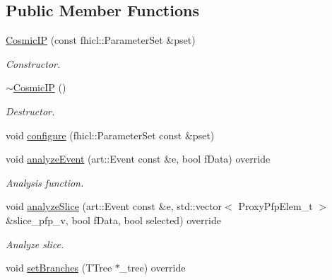 \subsection*{Public Member Functions}
\begin{DoxyCompactItemize}
\item 
\hyperlink{classanalysis_1_1CosmicIP_aa34450dae6a5ea2d51520aefcc9c0e6f}{Cosmic\+IP} (const fhicl\+::\+Parameter\+Set \&pset)
\begin{DoxyCompactList}\small\item\em Constructor. \end{DoxyCompactList}\item 
\hyperlink{classanalysis_1_1CosmicIP_a7edbd55f2290fab4c766f9a749731626}{$\sim$\+Cosmic\+IP} ()\hypertarget{classanalysis_1_1CosmicIP_a7edbd55f2290fab4c766f9a749731626}{}\label{classanalysis_1_1CosmicIP_a7edbd55f2290fab4c766f9a749731626}

\begin{DoxyCompactList}\small\item\em Destructor. \end{DoxyCompactList}\item 
void \hyperlink{classanalysis_1_1CosmicIP_af2564ec208979037940ff500dea10246}{configure} (fhicl\+::\+Parameter\+Set const \&pset)
\item 
void \hyperlink{classanalysis_1_1CosmicIP_aece9b4c45c6e1771df582b2c5e40c5d5}{analyze\+Event} (art\+::\+Event const \&e, bool f\+Data) override\hypertarget{classanalysis_1_1CosmicIP_aece9b4c45c6e1771df582b2c5e40c5d5}{}\label{classanalysis_1_1CosmicIP_aece9b4c45c6e1771df582b2c5e40c5d5}

\begin{DoxyCompactList}\small\item\em Analysis function. \end{DoxyCompactList}\item 
void \hyperlink{classanalysis_1_1CosmicIP_a86c9683c997d233949d8116940918e32}{analyze\+Slice} (art\+::\+Event const \&e, std\+::vector$<$ Proxy\+Pfp\+Elem\+\_\+t $>$ \&slice\+\_\+pfp\+\_\+v, bool f\+Data, bool selected) override
\begin{DoxyCompactList}\small\item\em Analyze slice. \end{DoxyCompactList}\item 
void \hyperlink{classanalysis_1_1CosmicIP_aa676a555c1fed07fac6af653db6610ce}{set\+Branches} (T\+Tree $\ast$\+\_\+tree) override\hypertarget{classanalysis_1_1CosmicIP_aa676a555c1fed07fac6af653db6610ce}{}\label{classanalysis_1_1CosmicIP_aa676a555c1fed07fac6af653db6610ce}


\end{DoxyCompactItemize}
